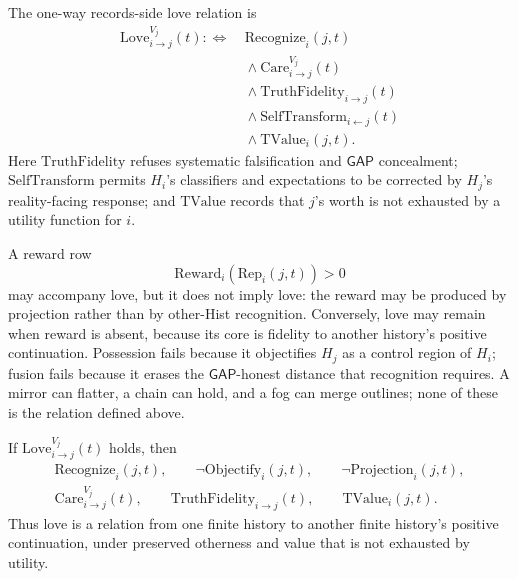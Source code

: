 \begin{definition}
\label{def:consciousness-universe-love-relation}
The one-way records-side love relation is
$$
\begin{aligned}
\mathrm{Love}^{V_j}_{i\to j}(t)
:\Longleftrightarrow\ &
\mathrm{Recognize}_i(j,t)\\
&{}\wedge \mathrm{Care}^{V_j}_{i\to j}(t)\\
&{}\wedge \mathrm{TruthFidelity}_{i\to j}(t)\\
&{}\wedge \mathrm{SelfTransform}_{i\leftarrow j}(t)\\
&{}\wedge \mathrm{TValue}_i(j,t).
\end{aligned}
$$
Here $\mathrm{TruthFidelity}$ refuses systematic falsification and $\mathsf{GAP}$ concealment; $\mathrm{SelfTransform}$ permits $H_i$'s classifiers and expectations to be corrected by $H_j$'s reality-facing response; and $\mathrm{TValue}$ records that $j$'s worth is not exhausted by a utility function for $i$.
\end{definition}

\begin{principle}
\label{prin:consciousness-universe-love-not-reward-possession-fusion}
A reward row
$$
\mathrm{Reward}_i(\mathrm{Rep}_i(j,t))>0
$$
may accompany love, but it does not imply love: the reward may be produced by projection rather than by other-Hist recognition. Conversely, love may remain when reward is absent, because its core is fidelity to another history's positive continuation. Possession fails because it objectifies $H_j$ as a control region of $H_i$; fusion fails because it erases the $\mathsf{GAP}$-honest distance that recognition requires. A mirror can flatter, a chain can hold, and a fog can merge outlines; none of these is the relation defined above.
\end{principle}

\begin{theorem}
\label{thm:consciousness-universe-love-preserves-otherness}
If $\mathrm{Love}^{V_j}_{i\to j}(t)$ holds, then
$$
\begin{gathered}
\mathrm{Recognize}_i(j,t),\qquad
\neg\mathrm{Objectify}_i(j,t),\qquad
\neg\mathrm{Projection}_i(j,t),\\
\mathrm{Care}^{V_j}_{i\to j}(t),\qquad
\mathrm{TruthFidelity}_{i\to j}(t),\qquad
\mathrm{TValue}_i(j,t).
\end{gathered}
$$
Thus love is a relation from one finite history to another finite history's positive continuation, under preserved otherness and value that is not exhausted by utility.
\end{theorem}

